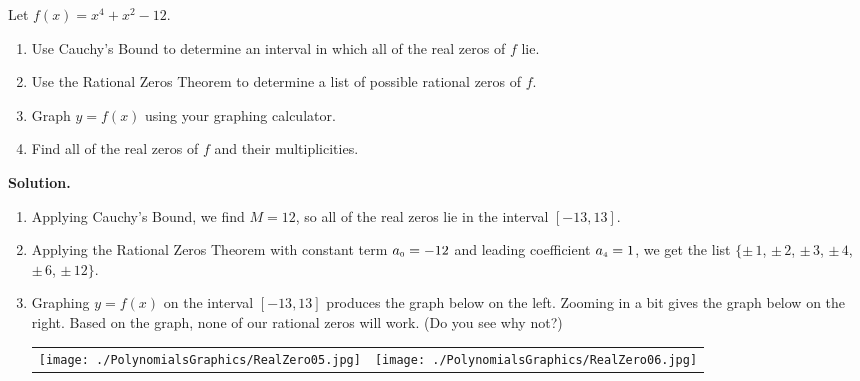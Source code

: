 \begin{ex}  Let $f(x) = x^4 + x^2 - 12$.

\begin{enumerate}

\item  Use Cauchy's Bound to determine an interval in which all of the real zeros of $f$ lie.

\item  Use the Rational Zeros Theorem to determine a list of possible rational zeros of $f$.

\item  Graph $y=f(x)$ using your graphing calculator.

\item  Find all of the real zeros of $f$ and their multiplicities.


\end{enumerate}

{\bf Solution.}

\begin{enumerate}

\item  Applying Cauchy's Bound, we find $M = 12$, so all of the real zeros lie in the interval $[-13,13]$.

\item  Applying the Rational Zeros Theorem with constant term $a_{\mbox{\tiny$0$}} = -12$ and leading coefficient $a_{\mbox{\tiny$4$}} = 1$, we get the list $\{\pm \, 1$, $\pm \, 2$, $\pm \, 3$, $\pm \, 4$, $\pm \, 6$, $\pm \, 12\}$.

\item  Graphing $y=f(x)$ on the interval $[-13,13]$ produces the graph below on the left.  Zooming in a bit gives the graph below on the right.  Based on the graph, none of our rational zeros will work. (Do you see why not?)


\begin{center}

\begin{tabular}{cc}

\texttt{[image: ./PolynomialsGraphics/RealZero05.jpg]} \hspace{0.75in} & \texttt{[image: ./PolynomialsGraphics/RealZero06.jpg]}

\end{tabular}
\end{center} 


\end{enumerate}
\end{ex}
